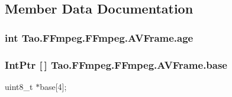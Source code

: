 \subsection{Member Data Documentation}
\hypertarget{struct_tao_1_1_f_fmpeg_1_1_f_fmpeg_1_1_a_v_frame_ad5f4419aa6730caf1ee4ec80164c8874}{
\subsubsection[{age}]{\setlength{\rightskip}{0pt plus 5cm}int {\bf Tao.FFmpeg.FFmpeg.AVFrame.age}}}
\label{struct_tao_1_1_f_fmpeg_1_1_f_fmpeg_1_1_a_v_frame_ad5f4419aa6730caf1ee4ec80164c8874}
\hypertarget{struct_tao_1_1_f_fmpeg_1_1_f_fmpeg_1_1_a_v_frame_ae99f3b732796ed1a4a5d254e3bb9e8f1}{
\subsubsection[{base}]{\setlength{\rightskip}{0pt plus 5cm}IntPtr \mbox{[}$\,$\mbox{]} {\bf Tao.FFmpeg.FFmpeg.AVFrame.base}}}
\label{struct_tao_1_1_f_fmpeg_1_1_f_fmpeg_1_1_a_v_frame_ae99f3b732796ed1a4a5d254e3bb9e8f1}


uint8\_\-t $\ast$base\mbox{[}4\mbox{]}; 

